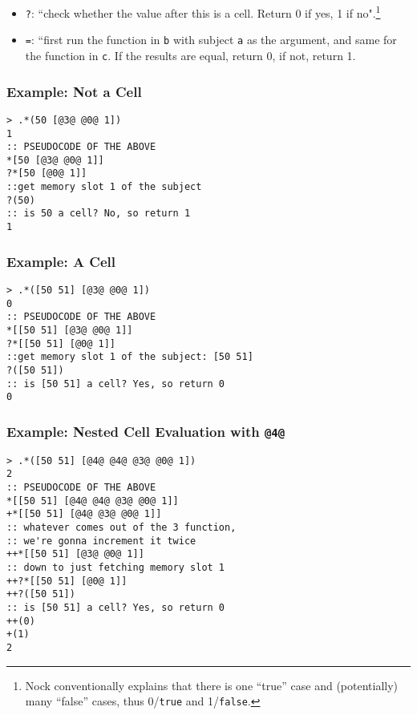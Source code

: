 \documentclass[twoside]{article}
\begin{document}
\begin{itemize}
  \item  \lstinline[style=inlinecode]{?}: ``check whether the value after this is a cell. Return 0 if yes, 1 if no".\footnote{Nock conventionally explains that there is one ``true'' case and (potentially) many ``false'' cases, thus 0/\texttt{true} and 1/\texttt{false}.}
  \item  \lstinline[style=inlinecode]{=}: ``first run the function in \lstinline[style=inlinecode]{b} with subject \lstinline[style=inlinecode]{a} as the argument, and same for the function in \lstinline[style=inlinecode]{c}. If the results are equal, return 0, if not, return 1.
\end{itemize}


\subsubsection{Example:  Not a Cell}

\begin{lstlisting}[style=listingcode]
> .*(50 [@3@ @0@ 1])
1
:: PSEUDOCODE OF THE ABOVE
*[50 [@3@ @0@ 1]]
?*[50 [@0@ 1]]
::get memory slot 1 of the subject
?(50)
:: is 50 a cell? No, so return 1
1
\end{lstlisting}

\subsubsection{Example:  A Cell}

\begin{lstlisting}[style=listingcode]
> .*([50 51] [@3@ @0@ 1])
0
:: PSEUDOCODE OF THE ABOVE
*[[50 51] [@3@ @0@ 1]]
?*[[50 51] [@0@ 1]]
::get memory slot 1 of the subject: [50 51]
?([50 51])
:: is [50 51] a cell? Yes, so return 0
0
\end{lstlisting}

\subsubsection{Example:  Nested Cell Evaluation with \lstinline[style=inlinecode]{@4@}}

\begin{lstlisting}[style=listingcode]
> .*([50 51] [@4@ @4@ @3@ @0@ 1])
2
:: PSEUDOCODE OF THE ABOVE
*[[50 51] [@4@ @4@ @3@ @0@ 1]]
+*[[50 51] [@4@ @3@ @0@ 1]]
:: whatever comes out of the 3 function,
:: we're gonna increment it twice
++*[[50 51] [@3@ @0@ 1]]
:: down to just fetching memory slot 1
++?*[[50 51] [@0@ 1]]
++?([50 51])
:: is [50 51] a cell? Yes, so return 0
++(0)
+(1)
2
\end{lstlisting}
\end{document}
